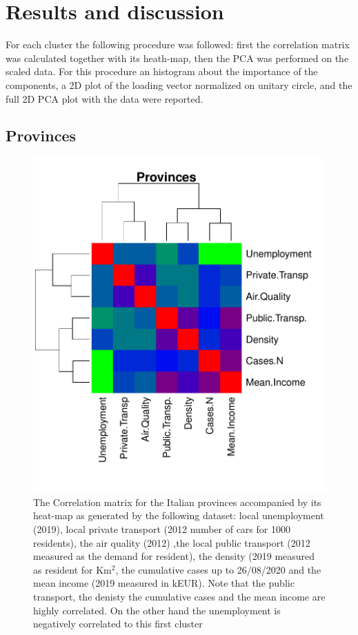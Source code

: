 \documentclass[
12pt, %
a4paper, %
oneside, %
headinclude,footinclude, %
BCOR5mm, %
]{scrartcl}
\begin{document}
\section{Results and discussion}

For each cluster the following procedure was followed: first the correlation matrix was calculated together with its heath-map, then the PCA was performed on the scaled data. For this procedure an histogram about the importance of the components, a 2D plot of the loading vector normalized on unitary circle, and the full 2D PCA plot with the data were reported. 

\subsection{Provinces}

\begin{figure}[h]
\begin{center}
\includegraphics[scale=1]{Pic/Province_FULL_CorrMatrix.pdf}
\caption{The Correlation matrix for the Italian provinces accompanied by its heat-map as generated by the following dataset: local unemployment (2019), local private transport (2012 number of cars for 1000 residents), the air quality (2012) ,the local public transport (2012 measured as the demand for resident), the density  (2019 measured as resident for Km$^{2}$, the cumulative cases up to 26/08/2020 and the mean income (2019 measured in kEUR). Note that the public transport, the denisty the cumulative cases and the mean income are highly correlated. On the other hand the unemployment is negatively correlated to this first cluster}
\label{Province_corr_matrix}
\end{center}
\end{figure}
\end{document}
